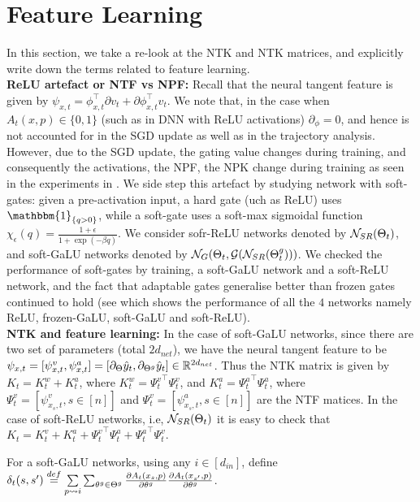 \section{Feature Learning}
In this section, we take a re-look at the NTK and NTK matrices, and explicitly write down the terms related to feature learning.\hfill\\
\textbf{ReLU artefact or NTF vs NPF:} Recall that the neural tangent feature is given by $\psi_{x,t}=\phi^\top_{x,t} {\partial} v_t + {\partial} \phi^\top_{x,t} v_t$. We note that, in the case when $A_t(x,p)\in\{0,1\}$ (such as in DNN with ReLU activations)  $\partial_{\phi}=0$, and hence is not accounted for in the SGD update as well as in the trajectory analysis. However, due to the SGD update, the gating value changes during training, and consequently the activations, the NPF, the NPK change during training as seen in the experiments in . We side step this artefact by studying network with soft-gates: given a pre-activation input, a hard gate (uch as ReLU) uses $\mathbbm{1}_{\{q>0\}}$, while a soft-gate uses a soft-max sigmoidal function $\chi_\epsilon(q)=\frac{1+\epsilon}{1+\exp(-\beta q)}$. We consider sofr-ReLU networks denoted by $\mathcal{N}_{SR}(\Theta_t)$, and soft-GaLU networks denoted by $\mathcal{N}_{G}(\Theta_t, \mathcal{G}(\mathcal{N}_{SR}({\Theta}^g_t)))$. We checked the performance of soft-gates by training, a soft-GaLU network and a soft-ReLU network, and the fact that adaptable gates generalise better than frozen gates continued to hold (see  which shows the performance of all the $4$ networks namely ReLU, frozen-GaLU, soft-GaLU and soft-ReLU).\hfill\\
\textbf{NTK and feature learning:} In the case of  soft-GaLU networks, since there are two set of parameters (total $2d_{net}$), we have the neural tangent feature to be $\psi_{x,t}=[\psi^v_{x,t},\psi^a_{x,t}]=[\partial_{\Theta} \hat{y}_t, \partial_{{\Theta}^g} \hat{y}_t]\in \mathbb{R}^{2d_{net}}$. Thus the NTK matrix is given by $K_t=K^w_t+K^a_t$,  where $K^w_t={\Psi^v_t}^\top \Psi^v_t$, and $K^a_t={\Psi^a_t}^\top \Psi^a_t$, where $\Psi^v_t=[\psi^v_{x_s,t},s\in[n]]$ and $\Psi^v_t=[\psi^a_{x_s,t},s\in[n]]$ are the NTF matices. In the case of  soft-ReLU networks, i.e, $\mathcal{N}_{SR}(\Theta_t)$  it is easy to check that $K_t={K^v_t}+{K^a_t}+{\Psi^v_t}^\top {\Psi^a_t}+{\Psi^a_t}^\top {\Psi^v_t}$.
\begin{definition}\label{def:delta}
For a soft-GaLU networks, using any $i\in[d_{in}]$, define $\delta_t(s,s')\stackrel{def}= \underset{{p\rightsquigarrow i}}{\sum} \sum_{\theta^g\in{\Theta}^g}\frac{\partial A_{t}(x_s,p)}{\partial \theta^g} \frac{\partial A_{t}(x_{s'},p)}{\partial \theta^g}$.
\end{definition}
